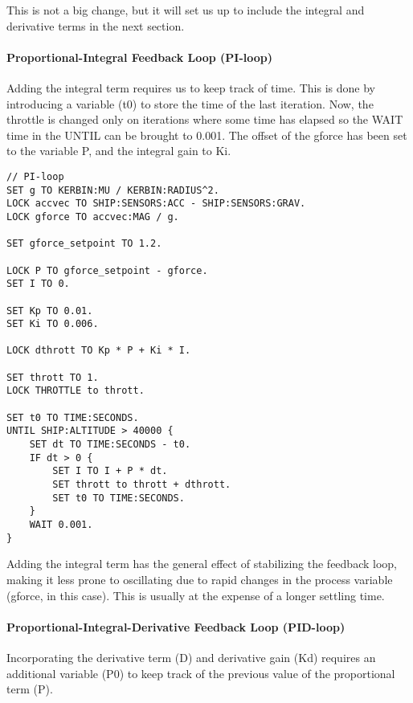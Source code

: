 This is not a big change, but it will set us up to include the integral and derivative terms in the next section.

\paragraph{Proportional-Integral Feedback Loop (PI-loop)}
Adding the integral term requires us to keep track of time. This is done by introducing a variable (t0) to store the time of the last iteration. Now, the throttle is changed only on iterations where some time has elapsed so the WAIT time in the UNTIL can be brought to 0.001. The offset of the gforce has been set to the variable P, and the integral gain to Ki.

\begin{Verbatim}[frame=single]
// PI-loop
SET g TO KERBIN:MU / KERBIN:RADIUS^2.
LOCK accvec TO SHIP:SENSORS:ACC - SHIP:SENSORS:GRAV.
LOCK gforce TO accvec:MAG / g.

SET gforce_setpoint TO 1.2.

LOCK P TO gforce_setpoint - gforce.
SET I TO 0.

SET Kp TO 0.01.
SET Ki TO 0.006.

LOCK dthrott TO Kp * P + Ki * I.

SET thrott TO 1.
LOCK THROTTLE to thrott.

SET t0 TO TIME:SECONDS.
UNTIL SHIP:ALTITUDE > 40000 {
    SET dt TO TIME:SECONDS - t0.
    IF dt > 0 {
        SET I TO I + P * dt.
        SET thrott to thrott + dthrott.
        SET t0 TO TIME:SECONDS.
    }
    WAIT 0.001.
}
\end{Verbatim} 

Adding the integral term has the general effect of stabilizing the feedback loop, making it less prone to oscillating due to rapid changes in the process variable (gforce, in this case). This is usually at the expense of a longer settling time.

\paragraph{Proportional-Integral-Derivative Feedback Loop (PID-loop)}
Incorporating the derivative term (D) and derivative gain (Kd) requires an additional variable (P0) to keep track of the previous value of the proportional term (P).

